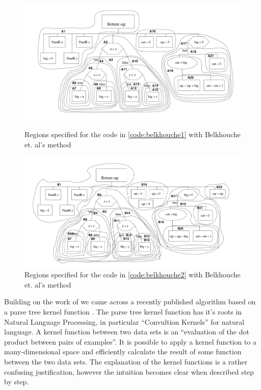 \begin{figure}[p]
	\centering
		\includegraphics[width=\textwidth]{Figures/Belkhouche1}
	\caption{Regions specified for the code in \cref{code:belkhouche1} with Belkhouche et. al's method~\cite{Belkhouche}}
	\label{fig:belkhoucheRegions1}
	
	\centering
		\includegraphics[width=\textwidth]{Figures/Belkhouche2}
	\caption{Regions specified for the code in \cref{code:belkhouche2} with Belkhouche et. al's method~\cite{Belkhouche}}
	\label{fig:BelkhoucheRegions2}

\end{figure}

Building on the work of \cite{Belkhouche}
we came across a recently published algorithm based on a parse tree kernel function
\cite{ParseTreeKernel}. The parse tree kernel function has it's roots
in Natural Language Processing, in particular ``Convultion Kernels'' for natural
language\cite{NLPKernel}. A kernel function between two data sets is an ``evaluation
of the dot product between pairs of examples''\cite{NLPKernel}. It is possible
to apply a kernel function to a many-dimensional space and efficiently calculate
the result of some function between the two data sets. The explanation of the
kernel functions is a rather confusing justification, however the intuition
becomes clear when described step by step.

